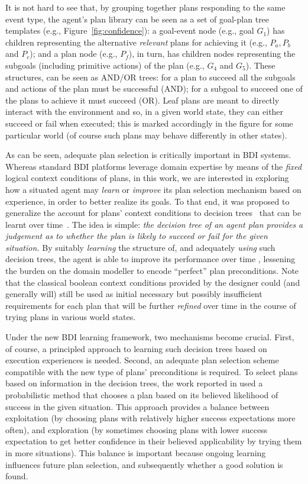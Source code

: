 It is not hard to see that, by grouping together plans responding to the same event type, the agent's plan library can be seen as
a set of goal-plan tree templates (e.g., Figure~\ref{fig:confidence}): a goal-event node (e.g., goal $G_1$) has children representing the alternative \emph{relevant} plans for achieving it (e.g., $P_a,P_b$ and $P_c$); and a plan node (e.g., $P_f$), in turn, has children nodes representing the subgoals (including primitive actions) of the plan (e.g., $G_4$ and $G_5$). These structures, can be seen as AND/OR trees: for a plan to succeed all the subgoals and actions of the plan must be successful (AND); for a subgoal to succeed one of the plans to achieve it must succeed (OR). Leaf plans are meant to directly interact with the environment and so, in a given world state, they can either succeed or fail when executed; this is marked accordingly in the figure for some particular world (of course such plans may behave differently in other states).


As can be seen, adequate plan selection is critically important in BDI systems. Whereas standard BDI platforms leverage domain expertise by means of the \emph{fixed} logical context conditions of plans, in this work, we are interested in exploring how a situated agent may \emph{learn} or \emph{improve} its plan selection mechanism based on experience, in order to better realize its goals.
To that end, it was proposed to generalize the account for plans' context conditions to decision trees~\cite{Mitchell97:ML} that can be learnt over time~\cite{airiau09:enhancing,singh10:extending,singh10:learning}. The idea is simple: \emph{the decision tree of an agent plan provides a judgement as to whether the plan is likely to succeed or fail for the given situation.}
By suitably \emph{learning} the structure of, and adequately \emph{using} such decision trees, the agent is able to improve its performance over time 
, lessening the burden on
the domain modeller to encode ``perfect'' plan preconditions. Note that the classical boolean context conditions provided by the designer could (and generally will) still be used as initial necessary but possibly insufficient requirements for each plan that will be further \emph{refined} over time in the course of trying plans in various world states.


Under the new BDI learning framework, two mechanisms become crucial. First, of course, a principled approach to learning such decision trees based on execution experiences is needed. Second, an adequate plan selection scheme compatible with the new type of plans' preconditions is required.
To select plans based on information in the decision trees, the work reported in \cite{singh10:extending,singh10:learning} used a probabilistic method that chooses a plan based on its believed likelihood of success in the given situation. This approach provides a balance between exploitation (by choosing plans with relatively higher success expectations more often), and exploration (by sometimes choosing plans with lower success expectation to get better confidence in their believed applicability by trying them in more situations). This balance is important because ongoing learning influences future plan selection, and subsequently whether a good solution is found.


